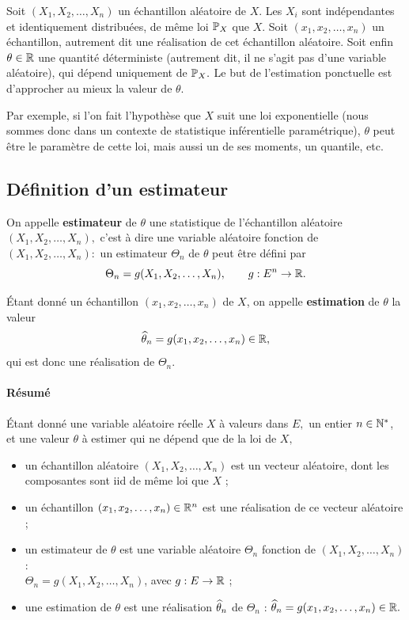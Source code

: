 Soit $(X_1, X_2, \dots, X_n)$ un échantillon aléatoire de $X$. Les $X_i$ sont
indépendantes et identiquement distribuées, de même loi $\mathbb{P}_X$ que $X.$ Soit
$(x_1, x_2, \dots, x_n)$ un échantillon, autrement dit une réalisation de cet
échantillon aléatoire. Soit enfin $\theta \in \mathbb{R}$ une quantité déterministe
(autrement dit, il ne s'agit pas d'une variable aléatoire), qui dépend
uniquement de $\mathbb{P}_X.$ Le but de l'estimation ponctuelle est d'approcher au
mieux la valeur de $\theta$.

Par exemple, si l'on fait l'hypothèse que $X$ suit une loi exponentielle (nous
sommes donc dans un contexte de statistique inférentielle paramétrique),
$\theta$ peut être le paramètre de cette loi, mais aussi un de ses moments, un
quantile, etc.


\subsection{Définition d'un estimateur}
On appelle \textbf{estimateur} de $\theta$ une statistique de l'échantillon
aléatoire $(X_1, X_2, \dots, X_n),$ c'est à dire une variable aléatoire
fonction de $(X_1, X_2, \dots, X_n) :$ un estimateur $\Theta_n$ de $\theta$
peut être défini par 
\[
  \Theta_n = g(X_1, X_2, \dots, X_n), \qquad g: E^n \to \mathbb{R}.
\]

Étant donné un échantillon $(x_1, x_2, \dots, x_n)$ de $X$, on appelle
\textbf{estimation} de $\theta$ la valeur
\[
  {\widehat \theta}_n = g(x_1, x_2, \dots, x_n) \in \mathbb{R},
\]
qui est donc une réalisation de $\Theta_n$.

\paragraph{Résumé}
Étant donné une variable aléatoire réelle $X$ à valeurs dans $E,$ un entier
$n \in \mathbb{N}^*$, et une valeur $\theta$ à estimer qui ne dépend que de la loi de
$X,$
\begin{itemize}
\item un échantillon aléatoire $(X_1, X_2, \dots, X_n)$ est un vecteur
  aléatoire, dont les composantes sont iid de même loi que $X$ ;
\item un échantillon $(x_1, x_2, \dots, x_n) \in \mathbb{R}^n$ est une réalisation de
  ce vecteur aléatoire ;
\item un estimateur de $\theta$ est une variable aléatoire $\Theta_n$ fonction
  de $(X_1, X_2, \dots, X_n)$ : \\ $\Theta_n = g(X_1, X_2, \dots, X_n)$, avec $g: E \to \mathbb{R}$ ;
\item une estimation de $\theta$ est une réalisation ${\widehat \theta}_n$ de
  $\Theta_n$ : ${\widehat \theta}_n = g(x_1, x_2, \dots, x_n) \in \mathbb{R}.$
\end{itemize}

